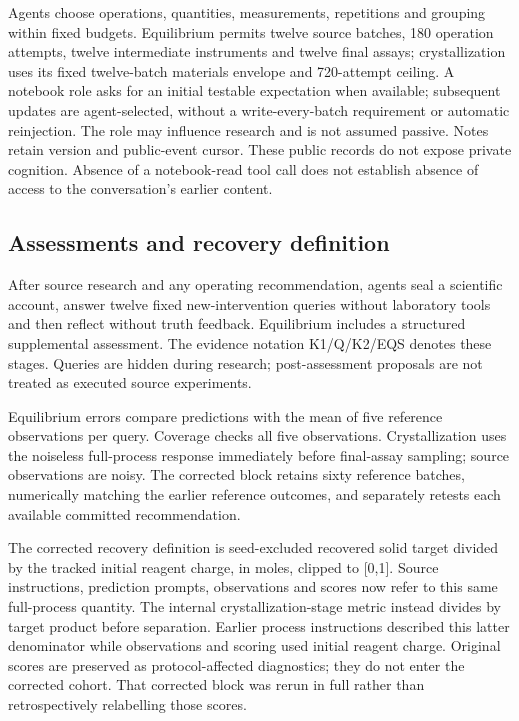 \documentclass[10pt,a4paper]{article}
\begin{document}
Agents choose operations, quantities, measurements, repetitions and grouping within fixed budgets. Equilibrium permits twelve source batches, 180 operation attempts, twelve intermediate instruments and twelve final assays; crystallization uses its fixed twelve-batch materials envelope and 720-attempt ceiling. A notebook role asks for an initial testable expectation when available; subsequent updates are agent-selected, without a write-every-batch requirement or automatic reinjection. The role may influence research and is not assumed passive. Notes retain version and public-event cursor. These public records do not expose private cognition. Absence of a notebook-read tool call does not establish absence of access to the conversation's earlier content.

\subsection{Assessments and recovery definition}\label{assessments-and-recovery-definition}

After source research and any operating recommendation, agents seal a scientific account, answer twelve fixed new-intervention queries without laboratory tools and then reflect without truth feedback. Equilibrium includes a structured supplemental assessment. The evidence notation K1/Q/K2/EQS denotes these stages. Queries are hidden during research; post-assessment proposals are not treated as executed source experiments.

Equilibrium errors compare predictions with the mean of five reference observations per query. Coverage checks all five observations. Crystallization uses the noiseless full-process response immediately before final-assay sampling; source observations are noisy. The corrected block retains sixty reference batches, numerically matching the earlier reference outcomes, and separately retests each available committed recommendation.

The corrected recovery definition is seed-excluded recovered solid target divided by the tracked initial reagent charge, in moles, clipped to {[}0,1{]}. Source instructions, prediction prompts, observations and scores now refer to this same full-process quantity. The internal crystallization-stage metric instead divides by target product before separation. Earlier process instructions described this latter denominator while observations and scoring used initial reagent charge. Original scores are preserved as protocol-affected diagnostics; they do not enter the corrected cohort. That corrected block was rerun in full rather than retrospectively relabelling those scores.
\end{document}
